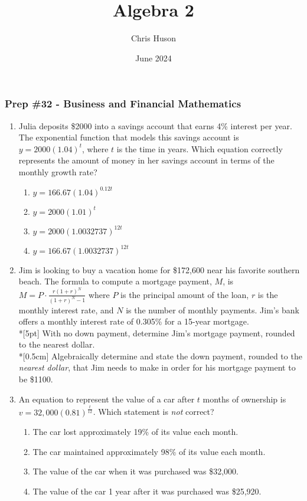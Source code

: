 \documentclass[12pt, twoside]{article}
\title{Algebra 2}
\author{Chris Huson}
\date{June 2024}
\begin{document}
\subsubsection*{Prep \#32 - Business and Financial Mathematics}
\begin{enumerate}

\item Julia deposits \$2000 into a savings account that earns 4\% interest per year. The exponential function that models this savings account is $y=2000(1.04)^t$, where $t$ is the time in years. Which equation correctly represents the amount of money in her savings account in terms of the monthly growth rate? 
    \begin{multicols}{2}
    \begin{enumerate}
        \item $y=166.67(1.04)^{0.12t}$
        \item $y=2000(1.01)^{t}$
        \item $y=2000(1.0032737)^{12t}$
        \item $y=166.67(1.0032737)^{12t}$
    \end{enumerate}
    \end{multicols} \vspace{0.5cm} %

\item Jim is looking to buy a vacation home for \$172,600 near his favorite southern beach. The formula to compute a mortgage payment, $M$, is $\displaystyle M=P \cdot \frac{r(1+r)^N}{(1+r)^N-1}$ where $P$ is the principal amount of the loan, $r$ is the monthly interest rate, and $N$ is the number of monthly payments. Jim’s bank offers a monthly interest rate of 0.305\% for a 15-year mortgage.\\*[5pt]
With no down payment, determine Jim’s mortgage payment, rounded to the nearest dollar.\\*[0.5cm]
Algebraically determine and state the down payment, rounded to the \emph{nearest dollar}, that Jim needs to make in order for his mortgage payment to be \$1100. \vspace{0.5cm}

\item An equation to represent the value of a car after $t$ months of ownership is $\displaystyle v=32,000(0.81)^{\frac{t}{12}}$. Which statement is \emph{not} correct?
\begin{enumerate}
    \item The car lost approximately 19\% of its value each month.
    \item The car maintained approximately 98\% of its value each month.
    \item The value of the car when it was purchased was \$32,000.
    \item The value of the car 1 year after it was purchased was \$25,920.
\end{enumerate} \vspace{0.5cm} %
        

\end{enumerate}
\end{document}
